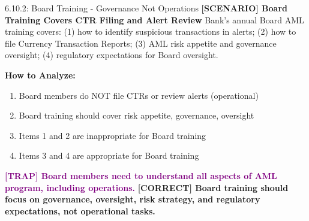 \documentclass[11pt,a4paper]{beamer}
\newcommand{\trap}[1]{\textcolor{purple}{\textbf{[TRAP] #1}}}
\newcommand{\correct}[1]{\textcolor{green!50!black}{\textbf{[CORRECT] #1}}}
\newcommand{\scenario}[1]{\textcolor{blue!70!black}{\textbf{[SCENARIO] #1}}}
\begin{document}
\begin{frame}{6.10.2: Board Training - Governance Not Operations}
	\scenario{Board Training Covers CTR Filing and Alert Review}
	Bank's annual Board AML training covers: (1) how to identify suspicious transactions in alerts; (2) how to file Currency Transaction Reports; (3) AML risk appetite and governance oversight; (4) regulatory expectations for Board oversight.
	
	\vspace{0.1cm}
	\textbf{How to Analyze:}
	\begin{enumerate}
		\item Board members do NOT file CTRs or review alerts (operational)
		\item Board training should cover risk appetite, governance, oversight
		\item Items 1 and 2 are inappropriate for Board training
		\item Items 3 and 4 are appropriate for Board training
	\end{enumerate}
	\trap{Board members need to understand all aspects of AML program, including operations.}
	\correct{Board training should focus on governance, oversight, risk strategy, and regulatory expectations, not operational tasks.}
\end{frame}
\end{document}
